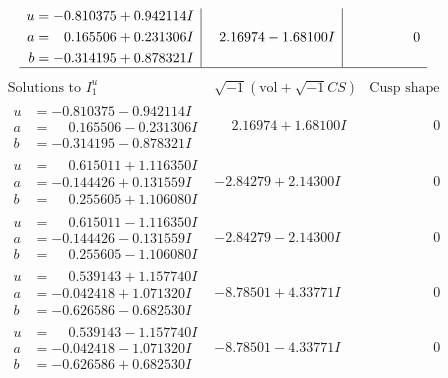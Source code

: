 \documentclass[1p]{elsarticle_modified}
\theoremstyle{definition}
\newcommand{\I}{\sqrt{-1}}
\begin{document}
$$\begin{array}{c|c|c}
\begin{aligned}
u &= -0.810375 + 0.942114 I \\
a &= \phantom{-}0.165506 + 0.231306 I \\
b &= -0.314195 + 0.878321 I\end{aligned}
 & \phantom{-}2.16974 - 1.68100 I & \phantom{-0.000000 } 0\\
 \hline 
 \end{array}$$\newpage$$\begin{array}{c|c|c}  
\text{Solutions to }I^u_{1}& \I (\text{vol} + \sqrt{-1}CS) & \text{Cusp shape}\\
 \hline 
\begin{aligned}
u &= -0.810375 - 0.942114 I \\
a &= \phantom{-}0.165506 - 0.231306 I \\
b &= -0.314195 - 0.878321 I\end{aligned}
 & \phantom{-}2.16974 + 1.68100 I & \phantom{-0.000000 } 0 \\ \hline\begin{aligned}
u &= \phantom{-}0.615011 + 1.116350 I \\
a &= -0.144426 + 0.131559 I \\
b &= \phantom{-}0.255605 + 1.106080 I\end{aligned}
 & -2.84279 + 2.14300 I & \phantom{-0.000000 } 0 \\ \hline\begin{aligned}
u &= \phantom{-}0.615011 - 1.116350 I \\
a &= -0.144426 - 0.131559 I \\
b &= \phantom{-}0.255605 - 1.106080 I\end{aligned}
 & -2.84279 - 2.14300 I & \phantom{-0.000000 } 0 \\ \hline\begin{aligned}
u &= \phantom{-}0.539143 + 1.157740 I \\
a &= -0.042418 + 1.071320 I \\
b &= -0.626586 - 0.682530 I\end{aligned}
 & -8.78501 + 4.33771 I & \phantom{-0.000000 } 0 \\ \hline\begin{aligned}
u &= \phantom{-}0.539143 - 1.157740 I \\
a &= -0.042418 - 1.071320 I \\
b &= -0.626586 + 0.682530 I\end{aligned}
 & -8.78501 - 4.33771 I & \phantom{-0.000000 } 0 \\ \hline\begin{aligned}

\end{aligned}
\end{array}$$
\end{document}
